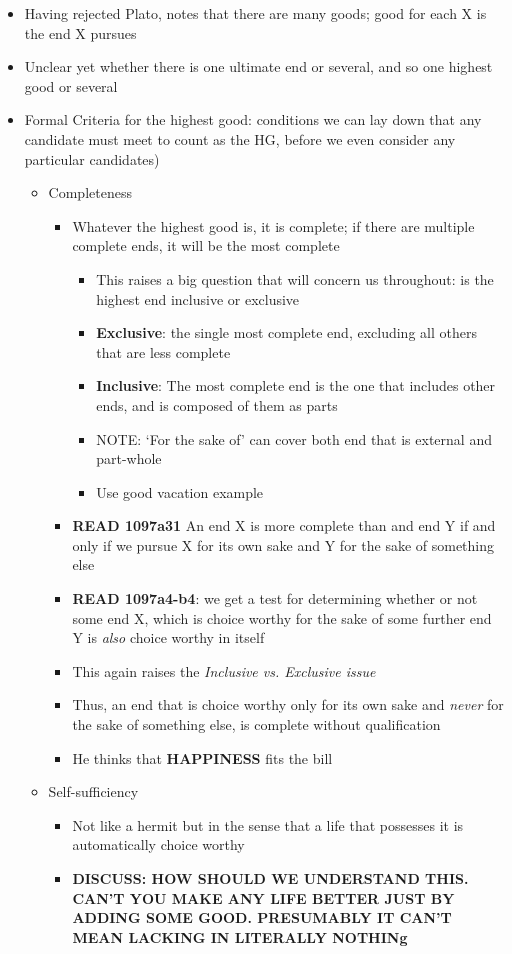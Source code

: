 \documentclass[11pt]{article}
\begin{document}
\begin{itemize}

\item{Having rejected Plato, notes that there are many goods; good for each X is the end X pursues}\item{Unclear yet whether there is one ultimate end or several, and so one highest good or several}\item{Formal Criteria for the highest good: conditions we can lay down that any candidate must meet to count as the HG, before we even consider any particular candidates)}\begin{itemize}

\item{Completeness}\begin{itemize}\item{Whatever the highest good is, it is complete; if there are multiple complete ends, it will be the most complete}\begin{itemize}\item{This raises a big question that will concern us throughout: is the highest end inclusive or exclusive}\item{\textbf{Exclusive}: the single most complete end, excluding all others that are less complete}\item{\textbf{Inclusive}: The most complete end is the one that includes other ends, and is composed of them as parts}\item{NOTE: `For the sake of' can cover both end that is external and part-whole}\item{Use good vacation example}\end{itemize}\item{\textbf{READ 1097a31} An end X is more complete than and end Y if and only if we pursue X for its own sake and Y for the sake of something else}\item{\textbf{READ 1097a4-b4}: we get a test for determining whether or not some end X, which is choice worthy for the sake of some further end Y is \emph{also} choice worthy in itself}\item{This again raises the \emph{Inclusive vs. Exclusive issue}}\item{Thus, an end that is choice worthy only for its own sake and \emph{never} for the sake of something else, is complete without qualification}\item{He thinks that \textbf{HAPPINESS} fits the bill}\end{itemize}

\item{Self-sufficiency}\begin{itemize}\item{Not like a hermit but in the sense that a life that possesses it is automatically choice worthy}\item{\textbf{DISCUSS: HOW SHOULD WE UNDERSTAND THIS. CAN'T YOU MAKE ANY LIFE BETTER JUST BY ADDING SOME GOOD. PRESUMABLY IT CAN'T MEAN LACKING IN LITERALLY NOTHINg}}\end{itemize}


\end{itemize}
\end{itemize}
\end{document}
